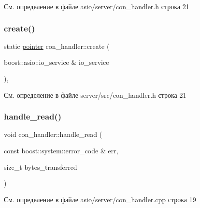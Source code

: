 См. определение в файле asio/server/con\+\_\+handler.\+h строка 21

\mbox{\label{classcon__handler_ab3cec40540ef3ff484ef0b639545eb17}} 
\subsubsection{\texorpdfstring{create()}{create()}\hspace{0.1cm}{\footnotesize\ttfamily [2/2]}}
{\footnotesize\ttfamily static \mbox{\hyperlink{classcon__handler_ada4a1b970f9fd8e55460a58cf7f7ce2c}{pointer}} con\+\_\+handler\+::create (\begin{DoxyParamCaption}\item[{boost\+::asio\+::io\+\_\+service \&}]{io\+\_\+service }\end{DoxyParamCaption})\hspace{0.3cm}{\ttfamily [inline]}, {\ttfamily [static]}}



См. определение в файле server/src/con\+\_\+handler.\+h строка 21

\mbox{\label{classcon__handler_a3b8e9edfc8fed79fcba0242a58b54bc2}} 
\subsubsection{\texorpdfstring{handle\_read()}{handle\_read()}\hspace{0.1cm}{\footnotesize\ttfamily [1/2]}}
{\footnotesize\ttfamily void con\+\_\+handler\+::handle\+\_\+read (\begin{DoxyParamCaption}\item[{const boost\+::system\+::error\+\_\+code \&}]{err,  }\item[{size\+\_\+t}]{bytes\+\_\+transferred }\end{DoxyParamCaption})}



См. определение в файле asio/server/con\+\_\+handler.\+cpp строка 19

\mbox{\label{classcon__handler_a3b8e9edfc8fed79fcba0242a58b54bc2}} 

